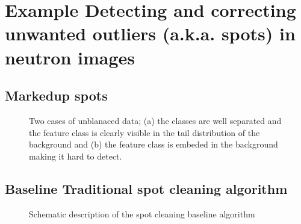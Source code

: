 \documentclass[letterpaper,10pt,english]{sphinxmanual}
\begin{document}
\section{Example \sphinxhyphen{} Detecting and correcting unwanted outliers (a.k.a. spots) in neutron images}
\label{\detokenize{ML4NeutronImageSegmentation:example-detecting-and-correcting-unwanted-outliers-a-k-a-spots-in-neutron-images}}
\begin{sphinxVerbatim}[commandchars=\\\{\}]
 
  
\PYG{p}{[}\PYG{p}{]}\PYG{p}{[}\PYG{p}{]}
\end{sphinxVerbatim}

\noindent{}


\subsection{Marked\sphinxhyphen{}up spots}
\label{\detokenize{ML4NeutronImageSegmentation:marked-up-spots}}
\begin{figure}[htbp]
\centering
\capstart

\noindent{}
\caption{Two cases of unblanaced data; (a) the classes are well separated and the feature class is clearly visible in the tail distribution of the background and (b) the feature class is embeded in the background making it hard to detect.}\label{\detokenize{ML4NeutronImageSegmentation:id14}}\end{figure}




\subsection{Baseline \sphinxhyphen{} Traditional spot cleaning algorithm}
\label{\detokenize{ML4NeutronImageSegmentation:baseline-traditional-spot-cleaning-algorithm}}
\begin{figure}[htbp]
\centering
\capstart

\noindent{}
\caption{Schematic description of the spot cleaning baseline algorithm}\label{\detokenize{ML4NeutronImageSegmentation:id15}}\end{figure}
\end{document}
